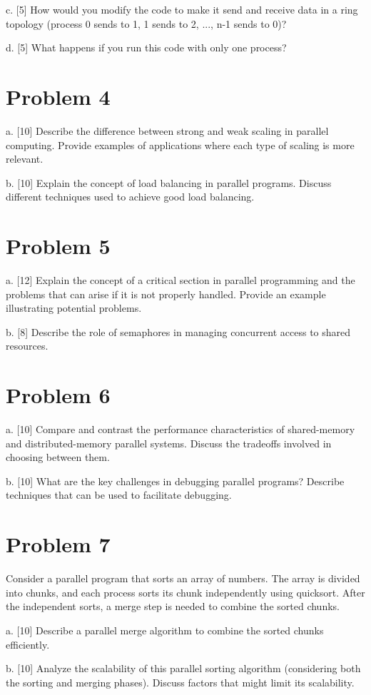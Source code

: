 \documentclass{article}
\begin{document}
c. [5]  How would you modify the code to make it send and receive data in a ring topology (process 0 sends to 1, 1 sends to 2, ..., n-1 sends to 0)?

d. [5] What happens if you run this code with only one process?


\section*{Problem 4}
a. [10] Describe the difference between strong and weak scaling in parallel computing. Provide examples of applications where each type of scaling is more relevant.

b. [10] Explain the concept of load balancing in parallel programs.  Discuss different techniques used to achieve good load balancing.


\section*{Problem 5}
a. [12] Explain the concept of a critical section in parallel programming and the problems that can arise if it is not properly handled.  Provide an example illustrating potential problems.

b. [8] Describe the role of semaphores in managing concurrent access to shared resources.


\section*{Problem 6}
a. [10]  Compare and contrast the performance characteristics of shared-memory and distributed-memory parallel systems.  Discuss the tradeoffs involved in choosing between them.

b. [10]  What are the key challenges in debugging parallel programs? Describe techniques that can be used to facilitate debugging.



\section*{Problem 7}
Consider a parallel program that sorts an array of numbers.  The array is divided into chunks, and each process sorts its chunk independently using quicksort.  After the independent sorts, a merge step is needed to combine the sorted chunks.

a. [10]  Describe a parallel merge algorithm to combine the sorted chunks efficiently.

b. [10]  Analyze the scalability of this parallel sorting algorithm (considering both the sorting and merging phases).  Discuss factors that might limit its scalability.
\end{document}
